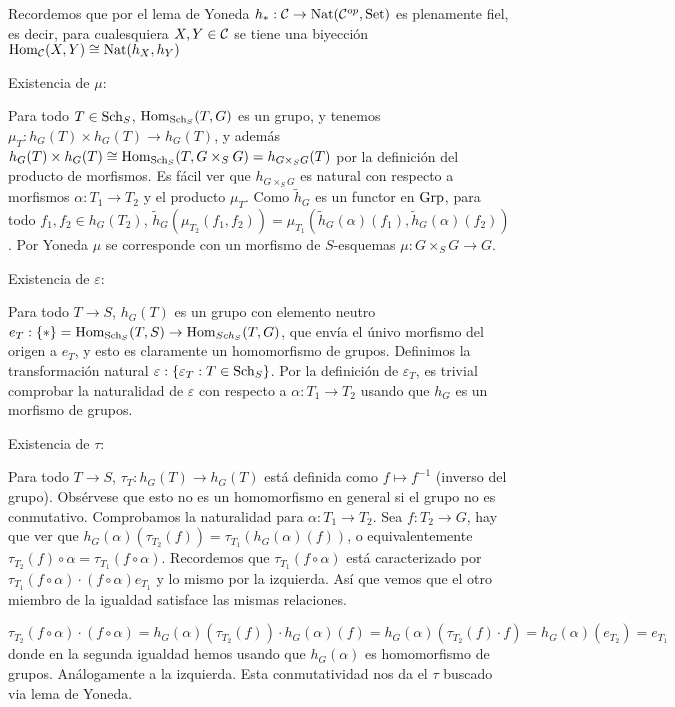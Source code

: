\documentclass[GA.tex]{subfiles}
\begin{document}
Recordemos que por el lema de Yoneda $h_*:\mathcal{C}\to\operatorname{Nat}(\mathcal{C}^{op}, \operatorname{Set})$ es plenamente fiel, es decir, para cualesquiera $X,Y\in\mathcal{C}$ se tiene una biyección $\operatorname{Hom}_{\mathcal{C}}(X,Y)\cong \operatorname{Nat}(h_X,h_Y)$

\begin{dem}
Existencia de $\mu$:

Para todo $T\in\operatorname{Sch}_S$, $\operatorname{Hom}_{\operatorname{Sch}_S}(T,G)$ es un grupo, y tenemos $\mu_T:h_G(T)\times h_G(T)\to h_G(T)$, y además $h_G(T)\times h_G(T)\cong\operatorname{Hom}_{\operatorname{Sch}_S}(T,G\times_SG)=h_{G\times_S G}(T)$ por la definición del producto de morfismos. Es fácil ver que $h_{G\times_S G}$ es natural con respecto a morfismos $\alpha:T_1\to T_2$ y el producto $\mu_T$. Como $\tilde{h}_G$ es un functor en $\operatorname{Grp}$, para todo $f_1,f_2\in h_G(T_2)$, $\tilde{h}_G(\mu_{T_2}(f_1,f_2))=\mu_{T_1}(\tilde{h}_G(\alpha)(f_1),\tilde{h}_G(\alpha)(f_2))$. Por Yoneda $\mu$ se corresponde con un morfismo de $S$-esquemas $\mu:G\times_SG\to G$. 

Existencia de $\varepsilon$:


Para todo $T\to S$, $h_G(T)$ es un grupo con elemento neutro $e_T:\{*\}=\operatorname{Hom}_{\operatorname{Sch}_S}(T,S)\to\operatorname{Hom}_{Sch_S}(T,G)$, que envía el únivo morfismo del origen a $e_T$, y esto es claramente un homomorfismo de grupos. Definimos la transformación natural $\varepsilon:\{\varepsilon_T: T\in\operatorname{Sch}_S\}$. Por la definición de $\varepsilon_T$, es trivial comprobar la naturalidad de $\varepsilon$ con respecto a $\alpha:T_1\to T_2$ usando que $h_G$ es un morfismo de grupos. 

Existencia de $\tau$:

Para todo $T\to S$, $\tau_T:h_G(T)\to h_G(T)$ está definida como $f\mapsto f^{-1}$ (inverso del grupo). Obsérvese que esto no es un homomorfismo en general si el grupo no es conmutativo. Comprobamos la naturalidad para $\alpha:T_1\to T_2$. Sea $f:T_2\to G$, hay que ver que $h_G(\alpha)(\tau_{T_2}(f))=\tau_{T_1}(h_G(\alpha)(f))$, o equivalentemente $\tau_{T_2}(f)\circ\alpha=\tau_{T_1}(f\circ\alpha)$. Recordemos que $\tau_{T_1}(f\circ\alpha)$ está caracterizado por $\tau_{T_1}(f\circ\alpha)\cdot (f\circ\alpha)e_{T_1}$ y lo mismo por la izquierda. Así que vemos que el otro miembro de la igualdad satisface las mismas relaciones. 

\[
\tau_{T_2}(f\circ\alpha)\cdot (f\circ\alpha)=h_G(\alpha)(\tau_{T_2}(f))\cdot h_G(\alpha)(f)=h_G(\alpha)(\tau_{T_2}(f)\cdot f)=h_G(\alpha)(e_{T_2})=e_{T_1}
\]
donde en la segunda igualdad hemos usando que $h_G(\alpha)$ es homomorfismo de grupos. Análogamente a la izquierda. Esta conmutatividad nos da el $\tau$ buscado via lema de Yoneda.


\end{dem}
\end{document}
